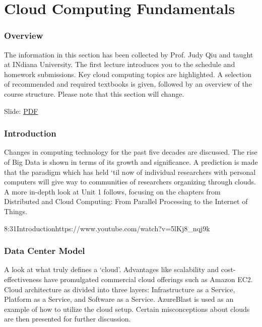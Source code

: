 \part{Cloud Computing Fundamentals}


\section{Overview}


The information in this section has been collected by Prof. Judy Qiu
and taught at INdiana University. The first lecture introduces you to the
schedule and homework submissions. Key cloud computing topics are
highlighted. A selection of recommended and required textbooks is given,
followed by an overview of the course structure. Please note that this
section will change.


  Slide:
  \href{https://drive.google.com/open?id=0B88HKpainTSfYjU4QzdDSms0Nk0}{PDF}

\section{Introduction}

Changes in computing technology for the past five decades are discussed.
The rise of Big Data is shown in terms of its growth and significance. A
prediction is made that the paradigm which has held `til now of
individual researchers with personal computers will give way to
communities of researchers organizing through clouds. A more in-depth
look at Unit 1 follows, focusing on the chapters from Distributed and
Cloud Computing: From Parallel Processing to the Internet of Things.

  {8:31}{Introduction}{https://www.youtube.com/watch?v=5lKj8_nqj9k}


\section{Data Center Model}

A look at what truly defines a `cloud'. Advantages like scalability and
cost-effectiveness have promulgated commercial cloud offerings such as
Amazon EC2. Cloud architecture as divided into three layers:
Infrastructure as a Service, Platform as a Service, and Software as a
Service. AzureBlast is used as an example of how to utilize the cloud
setup. Certain misconceptions about clouds are then presented for
further discussion.

